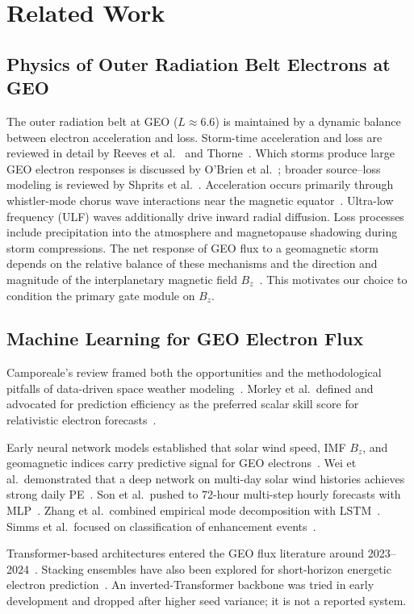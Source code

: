 \documentclass{ieeeaccess}
\begin{document}
\section{Related Work}
\label{sec:related}

\subsection{Physics of Outer Radiation Belt Electrons at GEO}
The outer radiation belt at GEO (\(L\approx6.6\)) is maintained by a dynamic
balance between electron acceleration and loss. Storm-time acceleration and loss
are reviewed in detail by Reeves et al.~\cite{b17} and Thorne~\cite{b18}. Which
storms produce large GEO electron responses is discussed by O'Brien et
al.~\cite{b19}; broader source--loss modeling is reviewed by Shprits et
al.~\cite{b20}. Acceleration occurs primarily through whistler-mode chorus wave
interactions near the magnetic equator~\cite{b2,b3,b6}. Ultra-low frequency (ULF)
waves additionally drive inward radial diffusion. Loss processes include
precipitation into the atmosphere and magnetopause shadowing during storm
compressions. The net response of GEO flux to a geomagnetic storm depends on the
relative balance of these mechanisms and the direction and magnitude of the
interplanetary magnetic field \(B_z\)~\cite{b2}. This motivates our choice to
condition the primary gate module on \(B_z\).

\subsection{Machine Learning for GEO Electron Flux}
Camporeale's review framed both the opportunities and the methodological pitfalls
of data-driven space weather modeling~\cite{b21}. Morley et al.\ defined and
advocated for prediction efficiency as the preferred scalar skill score for
relativistic electron forecasts~\cite{b22}.

Early neural network models established that solar wind speed, IMF \(B_z\), and
geomagnetic indices carry predictive signal for GEO electrons~\cite{b7}. Wei et
al.\ demonstrated that a deep network on multi-day solar wind histories achieves
strong daily PE~\cite{b8}. Son et al.\ pushed to 72-hour multi-step hourly
forecasts with MLP~\cite{b9}. Zhang et al.\ combined empirical mode decomposition
with LSTM~\cite{b10}. Simms et al.\ focused on classification of enhancement
events~\cite{b11}.

Transformer-based architectures entered the GEO flux literature around
2023--2024~\cite{b14,b15,b16}. Stacking ensembles have also been explored for
short-horizon energetic electron prediction~\cite{b23}. An inverted-Transformer backbone was tried in early development and
dropped after higher seed variance; it is not a reported system.
\end{document}
